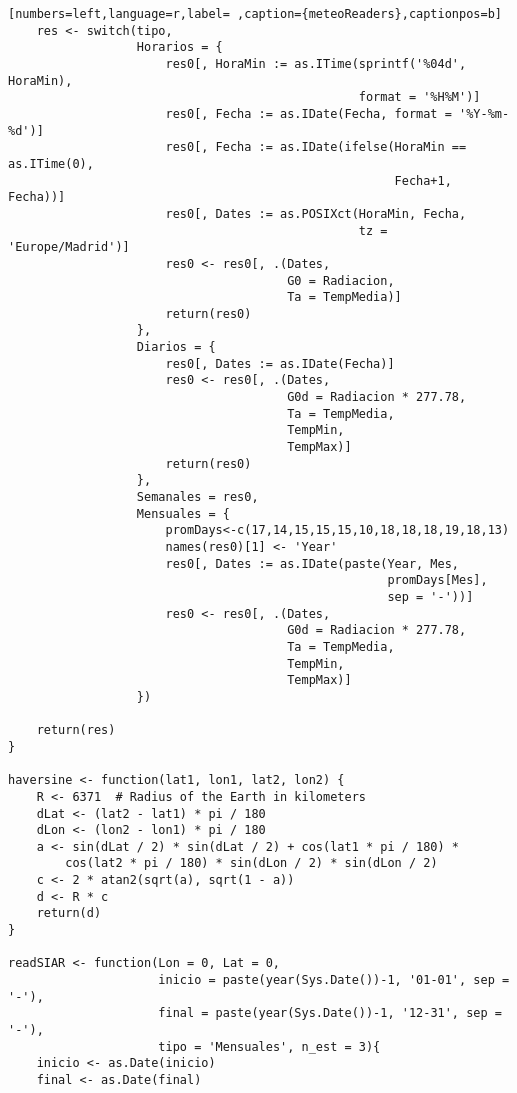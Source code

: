 \begin{lstlisting}[numbers=left,language=r,label= ,caption={meteoReaders},captionpos=b]
    res <- switch(tipo,
                  Horarios = {
                      res0[, HoraMin := as.ITime(sprintf('%04d', HoraMin),
                                                 format = '%H%M')]
                      res0[, Fecha := as.IDate(Fecha, format = '%Y-%m-%d')]
                      res0[, Fecha := as.IDate(ifelse(HoraMin == as.ITime(0),
                                                      Fecha+1, Fecha))]
                      res0[, Dates := as.POSIXct(HoraMin, Fecha,
                                                 tz = 'Europe/Madrid')]
                      res0 <- res0[, .(Dates,
                                       G0 = Radiacion,
                                       Ta = TempMedia)]
                      return(res0)
                  },
                  Diarios = {
                      res0[, Dates := as.IDate(Fecha)]
                      res0 <- res0[, .(Dates,
                                       G0d = Radiacion * 277.78,
                                       Ta = TempMedia,
                                       TempMin,
                                       TempMax)]
                      return(res0)
                  },
                  Semanales = res0,
                  Mensuales = {
                      promDays<-c(17,14,15,15,15,10,18,18,18,19,18,13)
                      names(res0)[1] <- 'Year'
                      res0[, Dates := as.IDate(paste(Year, Mes,
                                                     promDays[Mes],
                                                     sep = '-'))]
                      res0 <- res0[, .(Dates,
                                       G0d = Radiacion * 277.78,
                                       Ta = TempMedia,
                                       TempMin,
                                       TempMax)]
                  })

    return(res)
}

haversine <- function(lat1, lon1, lat2, lon2) {
    R <- 6371  # Radius of the Earth in kilometers
    dLat <- (lat2 - lat1) * pi / 180
    dLon <- (lon2 - lon1) * pi / 180
    a <- sin(dLat / 2) * sin(dLat / 2) + cos(lat1 * pi / 180) *
        cos(lat2 * pi / 180) * sin(dLon / 2) * sin(dLon / 2)
    c <- 2 * atan2(sqrt(a), sqrt(1 - a))
    d <- R * c
    return(d)
}

readSIAR <- function(Lon = 0, Lat = 0,
                     inicio = paste(year(Sys.Date())-1, '01-01', sep = '-'),
                     final = paste(year(Sys.Date())-1, '12-31', sep = '-'),
                     tipo = 'Mensuales', n_est = 3){
    inicio <- as.Date(inicio)
    final <- as.Date(final)


\end{lstlisting}
